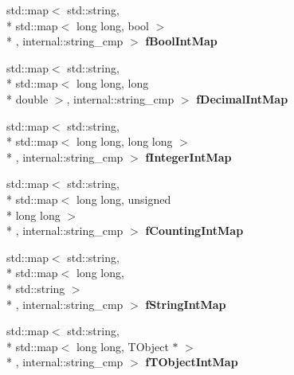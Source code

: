\begin{DoxyCompactItemize}
\item 
\hypertarget{class_h_a_l_1_1_analysis_data_a61184b1f5c3fe3a707ca6636ae9e13b0}{std\-::map$<$ std\-::string, \\*
std\-::map$<$ long long, bool $>$\\*
, internal\-::string\-\_\-cmp $>$ {\bfseries f\-Bool\-Int\-Map}}\label{class_h_a_l_1_1_analysis_data_a61184b1f5c3fe3a707ca6636ae9e13b0}

\item 
\hypertarget{class_h_a_l_1_1_analysis_data_af0f5c30034eba37c74179ea605623317}{std\-::map$<$ std\-::string, \\*
std\-::map$<$ long long, long \\*
double $>$, internal\-::string\-\_\-cmp $>$ {\bfseries f\-Decimal\-Int\-Map}}\label{class_h_a_l_1_1_analysis_data_af0f5c30034eba37c74179ea605623317}

\item 
\hypertarget{class_h_a_l_1_1_analysis_data_a62e023cb60a954070f043edd7dd77f75}{std\-::map$<$ std\-::string, \\*
std\-::map$<$ long long, long long $>$\\*
, internal\-::string\-\_\-cmp $>$ {\bfseries f\-Integer\-Int\-Map}}\label{class_h_a_l_1_1_analysis_data_a62e023cb60a954070f043edd7dd77f75}

\item 
\hypertarget{class_h_a_l_1_1_analysis_data_aa4f71b630137b5723ded88314a9301a0}{std\-::map$<$ std\-::string, \\*
std\-::map$<$ long long, unsigned \\*
long long $>$\\*
, internal\-::string\-\_\-cmp $>$ {\bfseries f\-Counting\-Int\-Map}}\label{class_h_a_l_1_1_analysis_data_aa4f71b630137b5723ded88314a9301a0}

\item 
\hypertarget{class_h_a_l_1_1_analysis_data_a68da09e7d00969715c53c1286d480c27}{std\-::map$<$ std\-::string, \\*
std\-::map$<$ long long, \\*
std\-::string $>$\\*
, internal\-::string\-\_\-cmp $>$ {\bfseries f\-String\-Int\-Map}}\label{class_h_a_l_1_1_analysis_data_a68da09e7d00969715c53c1286d480c27}

\item 
\hypertarget{class_h_a_l_1_1_analysis_data_a30331566889aaa845bd3edd475211cfc}{std\-::map$<$ std\-::string, \\*
std\-::map$<$ long long, T\-Object $\ast$ $>$\\*
, internal\-::string\-\_\-cmp $>$ {\bfseries f\-T\-Object\-Int\-Map}}\label{class_h_a_l_1_1_analysis_data_a30331566889aaa845bd3edd475211cfc}


\end{DoxyCompactItemize}
